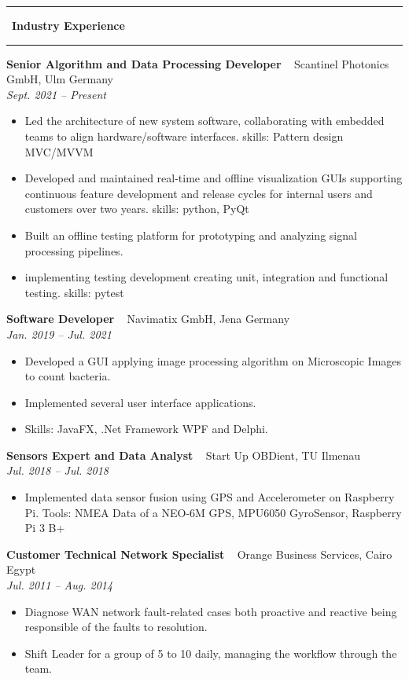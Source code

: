 \documentclass[10pt,a4paper]{article}
\newcommand{\sectionline}[1]{%
  \vspace{0.5em}
  \begin{center}
    \textcolor{title_color}{\rule[0.5ex]{0.25\linewidth}{0.5pt}}
    ~{\LARGE \bfseries \textcolor{title_color}{\cambria #1}}~
    \textcolor{title_color}{\rule[0.5ex]{0.25\linewidth}{0.5pt}}
  \end{center}
  \vspace{0.05em}
}
\begin{document}
\newpage
\sectionline{Industry Experience}
\textbf{Senior Algorithm and Data Processing Developer} ~ Scantinel Photonics GmbH, Ulm Germany\\
\textit{Sept. 2021 -- Present}
\begin{itemize}[leftmargin=*]
  \item Led the architecture of new system software, collaborating with embedded teams to align hardware/software interfaces. skills: Pattern design MVC/MVVM 
  \item  Developed and maintained real-time and offline visualization GUIs supporting continuous feature development and release cycles for internal users and customers over two years. skills: python, PyQt 
  \item Built an offline testing platform for prototyping and analyzing signal processing pipelines. 
  \item implementing testing development creating unit, integration and functional testing. skills: pytest 
\end{itemize}

\vspace{0.6em}
\textbf{Software Developer} ~ Navimatix GmbH, Jena Germany\\
\textit{Jan. 2019 -- Jul. 2021}
\begin{itemize}[leftmargin=*]
  \item Developed a GUI applying image processing algorithm on Microscopic Images to count bacteria.
  \item Implemented several user interface applications. 
  \item Skills: JavaFX, .Net Framework WPF and Delphi.
\end{itemize}

\vspace{0.6em}
\textbf{ Sensors Expert and Data Analyst} ~ Start Up OBDient, TU Ilmenau\\
\textit{Jul. 2018 -- Jul. 2018}
\begin{itemize}[leftmargin=*]
  \item  Implemented data sensor fusion using GPS and Accelerometer on Raspberry Pi. Tools: NMEA Data of a NEO-6M GPS, MPU6050 GyroSensor, Raspberry Pi 3 B+ 
\end{itemize}

\vspace{0.6em}
\textbf{Customer Technical Network Specialist} ~ Orange Business Services, Cairo Egypt\\
\textit{Jul. 2011 -- Aug. 2014}
\begin{itemize}[leftmargin=*]
  \item Diagnose WAN network fault-related cases both proactive and reactive being responsible of the faults to resolution.
  \item Shift Leader for a group of 5 to 10 daily, managing the workflow through the team. 
\end{itemize}
\end{document}
